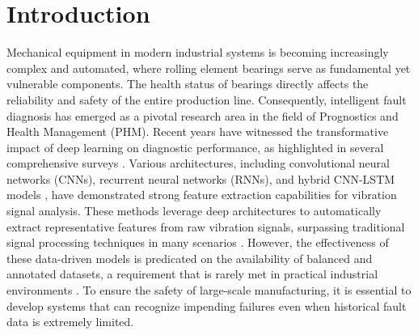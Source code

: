 \begin{abstract}
Rolling element bearings are critical components in industrial machinery, and their failure can lead to catastrophic system breakdowns. While deep learning has significantly advanced fault diagnosis, the performance of these models is often hampered by the class imbalance problem, where fault samples are scarce compared to normal data. To address this challenge, this paper proposes a novel framework termed CAC-CycleGAN-WGP for imbalanced bearing fault diagnosis. The methodological core involves a CycleGAN architecture that transforms normal vibration signals into realistic fault signals, integrated with a Conditional Auxiliary Classifier (CAC) to accurately capture the marginal probability distributions of various fault categories. To ensure training stability and suppress mode collapse, we incorporate Wasserstein distance with a Gradient Penalty (WGP). Furthermore, a quality assessment method based on Stacked Autoencoders (SAE) is developed to evaluate the fidelity of the generated samples. Extensive experiments are conducted on two imbalanced bearing datasets: the Case Western Reserve University (CWRU) dataset and a custom laboratory dataset. Comparative results against state-of-the-art methods, including SMOTE, GAN, WGAN, ACGAN, and ACWGAN-GP, demonstrate that the proposed CAC-CycleGAN-WGP significantly improves diagnostic accuracy and robustness under severe data imbalance, providing a viable solution for real-world industrial health monitoring.
\end{abstract}

\section{Introduction}
\label{sec:intro}

Mechanical equipment in modern industrial systems is becoming increasingly complex and automated, where rolling element bearings serve as fundamental yet vulnerable components. The health status of bearings directly affects the reliability and safety of the entire production line. Consequently, intelligent fault diagnosis has emerged as a pivotal research area in the field of Prognostics and Health Management (PHM). Recent years have witnessed the transformative impact of deep learning on diagnostic performance, as highlighted in several comprehensive surveys \cite{8, Lei2020, 9}. Various architectures, including convolutional neural networks (CNNs), recurrent neural networks (RNNs), and hybrid CNN-LSTM models \cite{10}, have demonstrated strong feature extraction capabilities for vibration signal analysis. These methods leverage deep architectures to automatically extract representative features from raw vibration signals, surpassing traditional signal processing techniques in many scenarios \cite{32}. However, the effectiveness of these data-driven models is predicated on the availability of balanced and annotated datasets, a requirement that is rarely met in practical industrial environments \cite{40, 41}. To ensure the safety of large-scale manufacturing, it is essential to develop systems that can recognize impending failures even when historical fault data is extremely limited.

